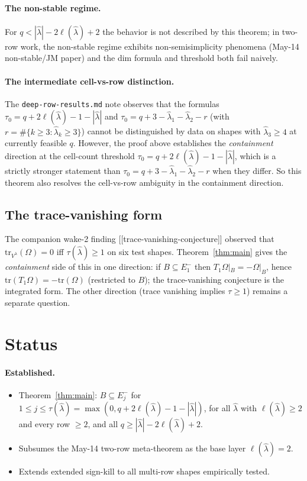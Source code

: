 \documentclass[11pt]{article}
\theoremstyle{definition}
\newcommand{\Om}{\Omega}
\newcommand{\hatl}{\widehat\lambda}
\newcommand{\elh}{\ell(\hatl)}
\begin{document}
\paragraph{The non-stable regime.}  For $q < |\hatl| - 2\elh + 2$ the
behavior is not described by this theorem; in two-row work, the
non-stable regime exhibits non-semisimplicity phenomena (May-14
non-stable/JM paper) and the dim formula and threshold both fail
naively.

\paragraph{The intermediate cell-vs-row distinction.}  The
\texttt{deep-row-results.md} note observes that the formulas
$\tau_0 = q + 2\elh - 1 - |\hatl|$ and
$\tau_0 = q + 3 - \hatl_1 - \hatl_2 - r$ (with $r = \#\{k \ge 3 :
\hatl_k \ge 3\}$) cannot be distinguished by data on shapes with
$\hatl_3 \ge 4$ at currently feasible $q$.  However, the proof above
establishes the \emph{containment} direction at the cell-count
threshold $\tau_0 = q + 2\elh - 1 - |\hatl|$, which is a strictly
stronger statement than $\tau_0 = q + 3 - \hatl_1 - \hatl_2 - r$ when
they differ.  So this theorem also resolves the cell-vs-row
ambiguity in the containment direction.

\subsection{The trace-vanishing form}

The companion wake-2 finding [[trace-vanishing-conjecture]] observed
that $\mathrm{tr}_{V^\lambda}(\Om) = 0$ iff $\tau(\hatl) \ge 1$ on six
test shapes.  Theorem~\ref{thm:main} gives the
\emph{containment} side of this in one direction: if
$B \subseteq E_1^-$ then $T_1 \Om|_B = -\Om|_B$, hence
$\mathrm{tr}(T_1 \Om) = -\mathrm{tr}(\Om)$ (restricted to $B$); the
trace-vanishing conjecture is the integrated form.  The other
direction (trace vanishing implies $\tau \ge 1$) remains a separate
question.

\section{Status}\label{sec:status}

\paragraph{Established.}
\begin{itemize}[topsep=0.3em,itemsep=0.1em]
\item Theorem~\ref{thm:main}: $B \subseteq E_j^-$ for $1 \le j \le
   \tau(\hatl) = \max(0, q + 2\elh - 1 - |\hatl|)$, for all $\hatl$
   with $\elh \ge 2$ and every row $\ge 2$, and all $q \ge
   |\hatl| - 2\elh + 2$.
\item Subsumes the May-14 two-row meta-theorem as the base layer
   $\elh = 2$.
\item Extends extended sign-kill to all multi-row shapes empirically
   tested.
\end{itemize}
\end{document}
